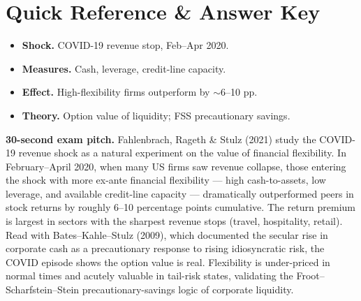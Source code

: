 \documentclass[11pt]{article}
\begin{document}
\section*{Quick Reference \& Answer Key}
\begin{answerbox}
\begin{itemize}
\item \textbf{Shock.} COVID-19 revenue stop, Feb--Apr 2020.
\item \textbf{Measures.} Cash, leverage, credit-line capacity.
\item \textbf{Effect.} High-flexibility firms outperform by $\sim$6--10 pp.
\item \textbf{Theory.} Option value of liquidity; FSS precautionary savings.
\end{itemize}
\end{answerbox}

\begin{keybox}
\textbf{30-second exam pitch.} Fahlenbrach, Rageth \& Stulz (2021) study the COVID-19 revenue shock as a natural experiment on the value of financial flexibility. In February--April 2020, when many US firms saw revenue collapse, those entering the shock with more ex-ante financial flexibility --- high cash-to-assets, low leverage, and available credit-line capacity --- dramatically outperformed peers in stock returns by roughly 6--10 percentage points cumulative. The return premium is largest in sectors with the sharpest revenue stops (travel, hospitality, retail). Read with Bates--Kahle--Stulz (2009), which documented the secular rise in corporate cash as a precautionary response to rising idiosyncratic risk, the COVID episode shows the option value is real. Flexibility is under-priced in normal times and acutely valuable in tail-risk states, validating the Froot--Scharfstein--Stein precautionary-savings logic of corporate liquidity.
\end{keybox}
\end{document}
